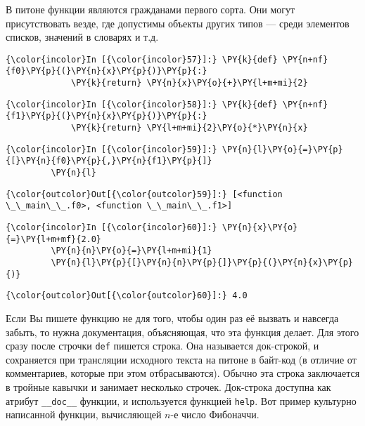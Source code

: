     В питоне функции являются гражданами первого сорта. Они могут
присутствовать везде, где допустимы объекты других типов --- среди
элементов списков, значений в словарях и т.д.

    \begin{Verbatim}[commandchars=\\\{\}]
{\color{incolor}In [{\color{incolor}57}]:} \PY{k}{def} \PY{n+nf}{f0}\PY{p}{(}\PY{n}{x}\PY{p}{)}\PY{p}{:}
             \PY{k}{return} \PY{n}{x}\PY{o}{+}\PY{l+m+mi}{2}
\end{Verbatim}

    \begin{Verbatim}[commandchars=\\\{\}]
{\color{incolor}In [{\color{incolor}58}]:} \PY{k}{def} \PY{n+nf}{f1}\PY{p}{(}\PY{n}{x}\PY{p}{)}\PY{p}{:}
             \PY{k}{return} \PY{l+m+mi}{2}\PY{o}{*}\PY{n}{x}
\end{Verbatim}

    \begin{Verbatim}[commandchars=\\\{\}]
{\color{incolor}In [{\color{incolor}59}]:} \PY{n}{l}\PY{o}{=}\PY{p}{[}\PY{n}{f0}\PY{p}{,}\PY{n}{f1}\PY{p}{]}
         \PY{n}{l}
\end{Verbatim}

            \begin{Verbatim}[commandchars=\\\{\}]
{\color{outcolor}Out[{\color{outcolor}59}]:} [<function \_\_main\_\_.f0>, <function \_\_main\_\_.f1>]
\end{Verbatim}
        
    \begin{Verbatim}[commandchars=\\\{\}]
{\color{incolor}In [{\color{incolor}60}]:} \PY{n}{x}\PY{o}{=}\PY{l+m+mf}{2.0}
         \PY{n}{n}\PY{o}{=}\PY{l+m+mi}{1}
         \PY{n}{l}\PY{p}{[}\PY{n}{n}\PY{p}{]}\PY{p}{(}\PY{n}{x}\PY{p}{)}
\end{Verbatim}

            \begin{Verbatim}[commandchars=\\\{\}]
{\color{outcolor}Out[{\color{outcolor}60}]:} 4.0
\end{Verbatim}
        
    Если Вы пишете функцию не для того, чтобы один раз её вызвать и навсегда
забыть, то нужна документация, объясняющая, что эта функция делает. Для
этого сразу после строчки \texttt{def} пишется строка. Она называется
док-строкой, и сохраняется при трансляции исходного текста на питоне в
байт-код (в отличие от комментариев, которые при этом отбрасываются).
Обычно эта строка заключается в тройные кавычки и занимает несколько
строчек. Док-строка доступна как атрибут \texttt{\_\_doc\_\_} функции, и
используется функцией \texttt{help}. Вот пример культурно написанной
функции, вычисляющей \(n\)-е число Фибоначчи.


